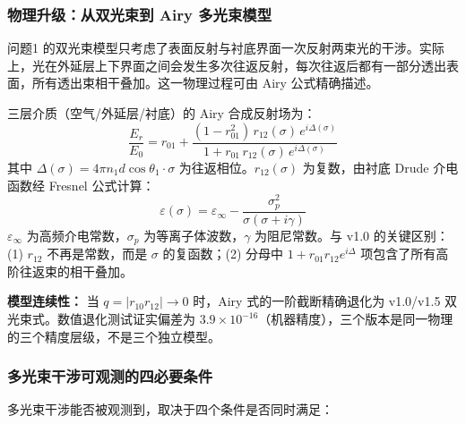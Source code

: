 \subsubsection{物理升级：从双光束到 Airy 多光束模型}

问题1 的双光束模型只考虑了表面反射与衬底界面一次反射两束光的干涉。实际上，光在外延层上下界面之间会发生多次往返反射，每次往返后都有一部分透出表面，所有透出束相干叠加。这一物理过程可由 Airy 公式精确描述\cite{ref-s25}。

三层介质（空气/外延层/衬底）的 Airy 合成反射场为：
\begin{equation}
    \frac{E_r}{E_0} = r_{01} + \frac{(1-r_{01}^2)\,r_{12}(\sigma)\,e^{i\Delta(\sigma)}}{1 + r_{01}\,r_{12}(\sigma)\,e^{i\Delta(\sigma)}}
\end{equation}
其中 $\Delta(\sigma) = 4\pi n_1 d\cos\theta_1\cdot\sigma$ 为往返相位。$r_{12}(\sigma)$ 为复数，由衬底 Drude 介电函数经 Fresnel 公式计算：
\begin{equation}
    \varepsilon(\sigma) = \varepsilon_\infty - \frac{\sigma_p^2}{\sigma(\sigma + i\gamma)}
\end{equation}
$\varepsilon_\infty$ 为高频介电常数，$\sigma_p$ 为等离子体波数，$\gamma$ 为阻尼常数。与 v1.0 的关键区别：(1) $r_{12}$ 不再是常数，而是 $\sigma$ 的复函数；(2) 分母中 $1+r_{01}r_{12}e^{i\Delta}$ 项包含了所有高阶往返束的相干叠加。

\textbf{模型连续性：} 当 $q=|r_{10}r_{12}|\to 0$ 时，Airy 式的一阶截断精确退化为 v1.0/v1.5 双光束式。数值退化测试证实偏差为 $3.9\times 10^{-16}$（机器精度），三个版本是同一物理的三个精度层级，不是三个独立模型。

\subsubsection{多光束干涉可观测的四必要条件}

多光束干涉能否被观测到，取决于四个条件是否同时满足：


